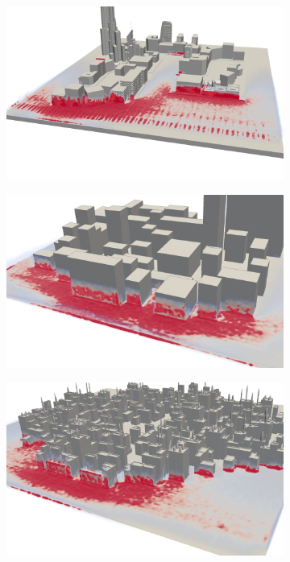 \begin{figure}[]
  \begin{subfigure}{.5\textwidth}
    \centering
    \includegraphics[width=\textwidth]{figures/impulse-heatmap-0.png}
  \end{subfigure}
  \begin{subfigure}{.5\textwidth}
    \centering
    \includegraphics[width=\textwidth]{figures/impulse-heatmap-1.png}
  \end{subfigure}
  \begin{subfigure}{\textwidth}
    \centering
    \includegraphics[width=\textwidth]{figures/impulse-heatmap-2.png}

\end{subfigure}
\end{figure}
